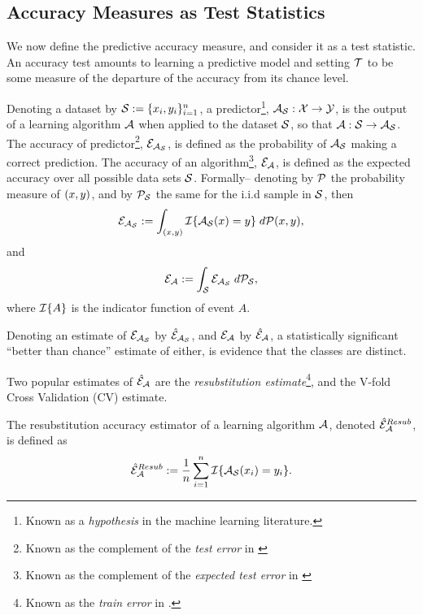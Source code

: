 \documentclass[12pt,a4paper]{article}
\begin{document}
\subsection{Accuracy Measures as Test Statistics}
We now define the predictive accuracy measure, and consider it as a test statistic.
An accuracy test amounts to learning a predictive model and setting $\mathcal{T}$ to be some measure of the departure of the accuracy from its chance level.  

Denoting a dataset by $\mathcal{S}:=\{x_i,y_i\}_{i=1}^n$, a predictor\footnote{Known as a \emph{hypothesis} in the machine learning literature.}, $\mathcal{A}_{\mathcal{S}}:\mathcal{X} \to \mathcal{Y}$, is the output of a learning algorithm $\mathcal{A}$ when applied to the dataset $\mathcal{S}$, so that $\mathcal{A}:\mathcal{S} \to \mathcal{A}_{\mathcal{S}}$. 
The accuracy of predictor\footnote{Known as the complement of the \emph{test error} in \cite{hastie_elements_2003}}, $\mathcal{E}_{\mathcal{A}_{\mathcal{S}}}$, is defined as the probability of $\mathcal{A}_{\mathcal{S}}$ making a correct prediction. 
The accuracy of an algorithm\footnote{Known as the complement of the \emph{expected test error} in \cite{hastie_elements_2003}}, $\mathcal{E}_{\mathcal{A}}$, is defined as the expected accuracy over all possible data sets $\mathcal{S}$. 
Formally-- denoting by $\mathcal{P}$ the probability measure of $(x, y)$, and by $\mathcal{P}_{\mathcal{S}}$ the same for the i.i.d sample in $\mathcal{S}$, then
\begin{align}
	\mathcal{E}_{\mathcal{A}_{\mathcal{S}}}:=\int_{(x,y)} \mathcal{I}{\{ \mathcal{A}_{\mathcal{S}}(x)=y \}} \; d\mathcal{P}(x,y),
\end{align}
and
\begin{align}
	\mathcal{E}_{\mathcal{A}}:=\int_{\mathcal{S}} \mathcal{E}_{\mathcal{A}_{\mathcal{S}}} \; d\mathcal{P}_{\mathcal{S}},
\end{align}
where $\mathcal{I}{\{ A \}}$ is the indicator function of event $A$. 

Denoting an estimate of $\mathcal{E}_{\mathcal{A}_{\mathcal{S}}}$ by $\hat{\mathcal{E}}_{\mathcal{A}_{\mathcal{S}}}$, and $\mathcal{E}_{\mathcal{A}}$ by $\hat{\mathcal{E}}_{\mathcal{A}}$, a statistically significant ``better than chance'' estimate of either, is evidence that the classes are distinct. 

Two popular estimates of $\hat{\mathcal{E}}_{\mathcal{A}}$ are the \emph{resubstitution estimate}\footnote{Known as the \emph{train error} in \cite{hastie_elements_2003}.}, and the V-fold Cross Validation (CV) estimate.
\begin{definition}
\label{def:resubstitution}
The resubstitution accuracy estimator of a learning algorithm $\mathcal{A}$, denoted $\hat{\mathcal{E}}_{\mathcal{A}}^{Resub}$,  is defined as
\begin{align}
	\hat{\mathcal{E}}_{\mathcal{A}}^{Resub} := \frac 1n \sum_{i=1}^{n} \mathcal{I}{\{ \mathcal{A}_{\mathcal{S}}(x_i)=y_i \}}.
\end{align}
\end{definition}
\end{document}
